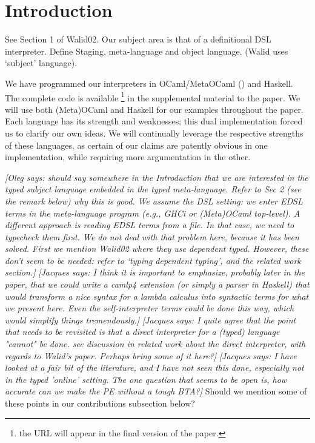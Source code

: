 \documentclass[preprint]{sigplanconf}
\newcommand{\jacques}[1]{{\it [Jacques says: #1]}}
\newcommand{\oleg}[1]{{\it [Oleg says: #1]}}
\begin{document}
\section{Introduction}\label{intro}

See Section 1 of Walid02. Our subject area is that of a definitional DSL
interpreter.
Define Staging, meta-language and object language. (Walid uses
`subject' language).

We have programmed our interpreters in OCaml/MetaOCaml (\cite{metaocaml})
and Haskell. The complete code is available 
\footnote{the URL will appear in the final version of the paper.}
in the supplemental material to the paper. We will use both
(Meta)OCaml and Haskell for our examples throughout the paper.
Each language has its strength and weaknesses; this dual implementation
forced us to clarify our own ideas.  We will continually leverage the
respective strengths of these languages, as certain of our claims are
patently obvious in one implementation, while requiring more argumentation
in the other.

\oleg{should say somewhere in the Introduction that we are interested
  in the typed subject language embedded in the typed
  meta-language. Refer to Sec 2 (see the remark below) why this is
  good. We assume the DSL setting: we enter EDSL terms in the
  meta-language program (e.g., GHCi or (Meta)OCaml top-level). A
  different approach is reading EDSL terms from a file. In that case, we
  need to typecheck them first. We do not deal with that problem here,
  because it has been solved. First we mention Walid02 where they use
  dependent typed. However, these don't seem to be needed: refer to
  `typing dependent typing', and the related work section.}
\jacques{I think it is important to emphasize, probably later in the 
paper, that we could write a camlp4 extension (or simply a parser in
Haskell) that would transform a nice syntax for a lambda calculus into
syntactic terms for what we present here.  Even the self-interpreter
terms could be done this way, which would simplify things tremendously.}
\jacques{I quite agree that the point that needs to be revisited is
  that a \emph{direct} interpreter for a (typed) language "cannot" be
  done. see discussion in related work about the direct interpreter,
  with regards to Walid's paper. Perhaps bring some of it here?}
\jacques{I have looked at a fair bit of the literature, and I have not
  seen this done, especially not in the typed 'online' setting.  The
  one question that seems to be open is, how accurate can we make the
  PE without a tough BTA?}
Should we mention some of these points in our contributions subsection
below?
\end{document}
